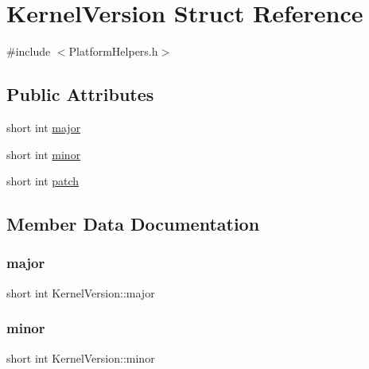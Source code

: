 \hypertarget{structKernelVersion}{}\section{Kernel\+Version Struct Reference}
\label{structKernelVersion}


{\ttfamily \#include $<$Platform\+Helpers.\+h$>$}

\subsection*{Public Attributes}
\begin{DoxyCompactItemize}
\item 
short int \hyperlink{structKernelVersion_ac51937696c5b4aa9f318fe783b09f674}{major}
\item 
short int \hyperlink{structKernelVersion_aa1f1aafe9a1705d67a10ec0db3452435}{minor}
\item 
short int \hyperlink{structKernelVersion_a198b3c8e108feec8e57fcc03712e13ef}{patch}
\end{DoxyCompactItemize}


\subsection{Member Data Documentation}
\mbox{\label{structKernelVersion_ac51937696c5b4aa9f318fe783b09f674}} 
\subsubsection{\texorpdfstring{major}{major}}
{\footnotesize\ttfamily short int Kernel\+Version\+::major}

\mbox{\label{structKernelVersion_aa1f1aafe9a1705d67a10ec0db3452435}} 
\subsubsection{\texorpdfstring{minor}{minor}}
{\footnotesize\ttfamily short int Kernel\+Version\+::minor}

\mbox{\label{structKernelVersion_a198b3c8e108feec8e57fcc03712e13ef}} 
